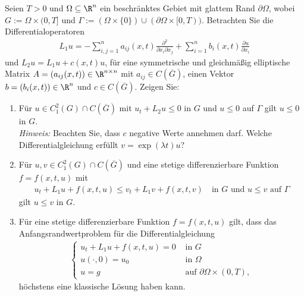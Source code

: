
\begin{exercise}

\phantom{}

Seien $T > 0$ und $\Omega \subseteq \R^n$ ein beschränktes Gebiet mit glattem Rand
$\partial\Omega$, wobei $G := \Omega \times (0,T]$ und
$\Gamma := (\Omega \times \{0\}) \cup (\partial\Omega \times [0,T))$.
Betrachten Sie die Differentialoperatoren
\begin{align*}
  L_1u = -\sum_{i,j=1}^n a_{ij}(x,t)\frac{\partial^2}{\partial x_i \partial x_j}
  + \sum_{i=1}^n b_i(x,t)\frac{\partial u}{\partial x_i}
\end{align*}
und $L_2u = L_1u + c(x,t)u$, für eine symmetrische und gleichmäßig elliptische Matrix
$A = (a_{ij}(x,t)) \in \R^{n\times n}$ mit $a_{ij} \in C(\overline{G})$, einen
Vektor $b = (b_i(x,t)) \in \R^n$ und $c \in C(\overline{G})$. Zeigen Sie:
\begin{enumerate}[label = (\roman*)]
  \item Für $u \in C_1^2(G) \cap C(\overline{G})$ mit $u_t + L_2u \leq 0$ in $G$
  und $u \leq 0$ auf $\Gamma$ gilt $u \leq 0$ in $G$. \\
  \textit{Hinweis:} Beachten Sie, dass $c$ negative Werte annehmen darf.
  Welche Differentialgleichung erfüllt $v = \exp(\lambda t)u$?
  
  \item Für $u,v \in C_1^2(G) \cap C(\overline{G})$ und eine stetige differenzierbare
  Funktion $f = f(x,t,u)$ mit
  \begin{align*}
    u_t + L_1u + f(x,t,u) \leq v_t + L_1v + f(x,t,v) \quad \text{in } G
    \text{ und } u \leq v \text{ auf } \Gamma
  \end{align*}
  gilt $u \leq v$ in $G$.
  
  \item Für eine stetige differenzierbare Funktion $f = f(x,t,u)$ gilt, dass das Anfangsrandwertproblem für die Differentialgleichung 
  \begin{align*}
	  \begin{cases}
	  	u_t + L_1 u + f(x,t,u) = 0 & \text{ in } G \\
	  	u(\cdot, 0) = u_0 & \text{ in } \Omega \\
	  	u = g & \text{ auf } \partial \Omega \times (0, T),
	  \end{cases}
  \end{align*}
  höchstens eine klassische Lösung haben kann. 
\end{enumerate}
\end{exercise}

